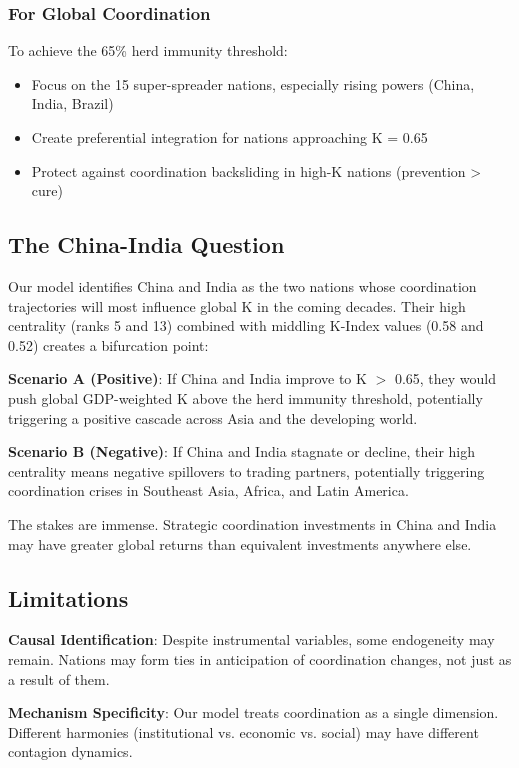 \documentclass[12pt,a4paper]{article}
\begin{document}
\subsubsection{For Global Coordination}
To achieve the 65\% herd immunity threshold:
\begin{itemize}
    \item Focus on the 15 super-spreader nations, especially rising powers (China, India, Brazil)
    \item Create preferential integration for nations approaching K = 0.65
    \item Protect against coordination backsliding in high-K nations (prevention > cure)
\end{itemize}

\subsection{The China-India Question}

Our model identifies China and India as the two nations whose coordination trajectories will most influence global K in the coming decades. Their high centrality (ranks 5 and 13) combined with middling K-Index values (0.58 and 0.52) creates a bifurcation point:

\textbf{Scenario A (Positive)}: If China and India improve to K $>$ 0.65, they would push global GDP-weighted K above the herd immunity threshold, potentially triggering a positive cascade across Asia and the developing world.

\textbf{Scenario B (Negative)}: If China and India stagnate or decline, their high centrality means negative spillovers to trading partners, potentially triggering coordination crises in Southeast Asia, Africa, and Latin America.

The stakes are immense. Strategic coordination investments in China and India may have greater global returns than equivalent investments anywhere else.

\subsection{Limitations}

\textbf{Causal Identification}: Despite instrumental variables, some endogeneity may remain. Nations may form ties in anticipation of coordination changes, not just as a result of them.

\textbf{Mechanism Specificity}: Our model treats coordination as a single dimension. Different harmonies (institutional vs. economic vs. social) may have different contagion dynamics.
\end{document}
